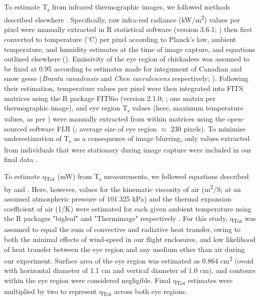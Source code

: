 \documentclass[12pt]{article}
\begin{document}
\noindent To estimate T\textsubscript{s} from infrared thermographic images, we followed methods described elsewhere \citep{robertson_2020a}. Specifically, raw infra-red radiance (kW/m\textsuperscript{2}) values per pixel were manually extracted in R statistical software (version 3.6.1; \citealt{rcore_2019}) then first converted to temperature ($^{\circ}$C) per pixel according to Planck's law, ambient temperature, and humidity estimates at the time of image capture, and equations outlined elsewhere (\citealt{minkina_2009,tattersall_2016}). Emissivity of the eye region of chickadees was assumed to be fixed at 0.95 according to estimates made for integument of Canadian and snow geese (\textit{Branta canadensis} and \textit{Chen caerulescens} respectively; \citealt{best_1981}). Following their estimation, temperature values per pixel were then integrated into FITS matrices using the R package FITSio (version 2.1.0; \citealt{harris_2016}; one matrix per thermographic image), and eye region T\textsubscript{s} values (here, maximum temperature values, as per \citealt{jerem_2015}) were manually extracted from within matrices using the open-sourced software FIJI (\citealt{schindelin_2012}; average size of eye region $\approx$ 230 pixels). To minimise underestimation of T\textsubscript{s} as a consequence of image blurring, only values extracted from individuals that were stationary during image capture were included in our final data \citep{tattersall_2016}. \vspace{1cm}

\noindent To estimate q\textsubscript{Tot} (mW) from T\textsubscript{s} measurements, we followed equations described by \citet{mccafferty_2011} and \citet{nord_2019}. Here, however, values for the kinematic viscosity of air (m\textsuperscript{2}/S; at an assumed atmospheric pressure of 101.325 kPa) and the thermal expansion coefficient of air (1/K) were estimated for each given ambient temperature using the R packages "bigleaf" and "Thermimage" respectively \citep{bigleaf,thermimage}. For this study, q\textsubscript{Tot} was assumed to equal the sum of convective and radiative heat transfer, owing to both the minimal effects of wind-speed in our flight enclosures, and low likelihood of heat transfer between the eye region and any medium other than air during our experiment. Surface area of the eye region was estimated as 0.864 cm\textsuperscript{2} (ovoid with horizontal diameter of 1.1 cm and vertical diameter of 1.0 cm), and contours within the eye region were considered negligible. Final q\textsubscript{Tot} estimates were multiplied by two to represent q\textsubscript{Tot} across both eye regions.\vspace{0.5cm}
\end{document}
